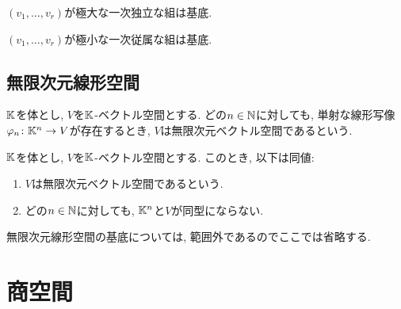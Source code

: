 \begin{prop}
  $(v_1,\ldots, v_r)$が極大な一次独立な組は基底.
\end{prop}
\begin{prop}
  $(v_1,\ldots, v_r)$が極小な一次従属な組は基底.
\end{prop}


\section{無限次元線形空間}
\begin{definition}
$\mathbb{K}$を体とし,
$V$を$\mathbb{K}$-ベクトル空間とする.
どの$n\in\mathbb{N}$に対しても,
単射な線形写像$\varphi_n\colon \mathbb{K}^n\to V$が存在するとき,
$V$は無限次元ベクトル空間であるという.
\end{definition}
\begin{remark}
$\mathbb{K}$を体とし,
$V$を$\mathbb{K}$-ベクトル空間とする.
このとき, 以下は同値:
\begin{enumerate}
\item
$V$は無限次元ベクトル空間であるという.
\item
どの$n\in\mathbb{N}$に対しても,
$\mathbb{K}^n$と$V$が同型にならない.
\end{enumerate}
\end{remark}
無限次元線形空間の基底については,
範囲外であるのでここでは省略する.

\begin{quiz}
\end{quiz}

\chapter{商空間}
